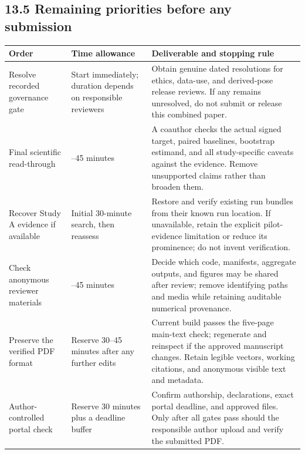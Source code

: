 \documentclass[11pt,letterpaper]{article}
\newcounter{none}
\begin{document}
\subsection{13.5 Remaining priorities before any
submission}\label{remaining-priorities-before-any-submission}

\begin{minipage}{\linewidth}

{\def\LTcaptype{none} %
\begin{longtable}[]{@{}
  >{\raggedright\arraybackslash}p{}
  >{\raggedright\arraybackslash}p{}
  >{\raggedright\arraybackslash}p{}@{}}
\toprule\noalign{}
\begin{minipage}[b]{\linewidth}\raggedright
Order
\end{minipage} & \begin{minipage}[b]{\linewidth}\raggedright
Time allowance
\end{minipage} & \begin{minipage}[b]{\linewidth}\raggedright
Deliverable and stopping rule
\end{minipage} \\
\midrule\noalign{}
\endhead
\bottomrule\noalign{}
\endlastfoot
Resolve recorded governance gate & Start immediately; duration depends
on responsible reviewers & Obtain genuine dated resolutions for ethics,
data-use, and derived-pose release reviews. If any remains unresolved,
do not submit or release this combined paper. \\
Final scientific read-through & 30--45 minutes & A coauthor checks the
actual signed target, paired baselines, bootstrap estimand, and all
study-specific caveats against the evidence. Remove unsupported claims
rather than broaden them. \\
Recover Study A evidence if available & Initial 30-minute search, then
reassess & Restore and verify existing run bundles from their known run
location. If unavailable, retain the explicit pilot-evidence limitation
or reduce its prominence; do not invent verification. \\
Check anonymous reviewer materials & 30--45 minutes & Decide which code,
manifests, aggregate outputs, and figures may be shared after review;
remove identifying paths and media while retaining auditable numerical
provenance. \\
Preserve the verified PDF format & Reserve 30--45 minutes after any
further edits & Current build passes the five-page main-text check;
regenerate and reinspect if the approved manuscript changes. Retain
legible vectors, working citations, and anonymous visible text and
metadata. \\
Author-controlled portal check & Reserve 30 minutes plus a deadline
buffer & Confirm authorship, declarations, exact portal deadline, and
approved files. Only after all gates pass should the responsible author
upload and verify the submitted PDF. \\
\end{longtable}
}

\end{minipage}
\end{document}
